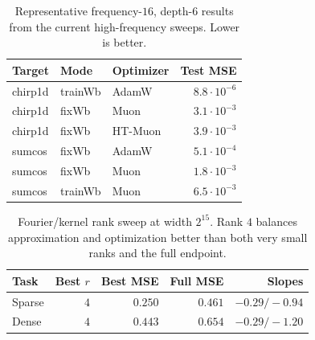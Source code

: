 \documentclass{article}
\begin{document}
\begin{table}[h]
\centering
\caption{Representative frequency-$16$, depth-$6$ results from the current high-frequency sweeps. Lower is better.}
\label{tab:freq16}
\begin{tabular}{lllr}
\toprule
Target & Mode & Optimizer & Test MSE \\
\midrule
chirp1d & trainWb & AdamW & $8.8\cdot10^{-6}$ \\
chirp1d & fixWb & Muon & $3.1\cdot10^{-3}$ \\
chirp1d & fixWb & HT-Muon & $3.9\cdot10^{-3}$ \\
sumcos & fixWb & AdamW & $5.1\cdot10^{-4}$ \\
sumcos & fixWb & Muon & $1.8\cdot10^{-3}$ \\
sumcos & trainWb & Muon & $6.5\cdot10^{-3}$ \\
\bottomrule
\end{tabular}
\end{table}

\begin{table}[h]
\centering
\caption{Fourier/kernel rank sweep at width $2^{15}$. Rank $4$ balances approximation and optimization better than both very small ranks and the full endpoint.}
\label{tab:fourier-rank}
\begin{tabular}{lrrrr}
\toprule
Task & Best $r$ & Best MSE & Full MSE & Slopes \\
\midrule
Sparse & $4$ & $0.250$ & $0.461$ & $-0.29/-0.94$ \\
Dense & $4$ & $0.443$ & $0.654$ & $-0.29/-1.20$ \\
\bottomrule
\end{tabular}
\end{table}
\end{document}

